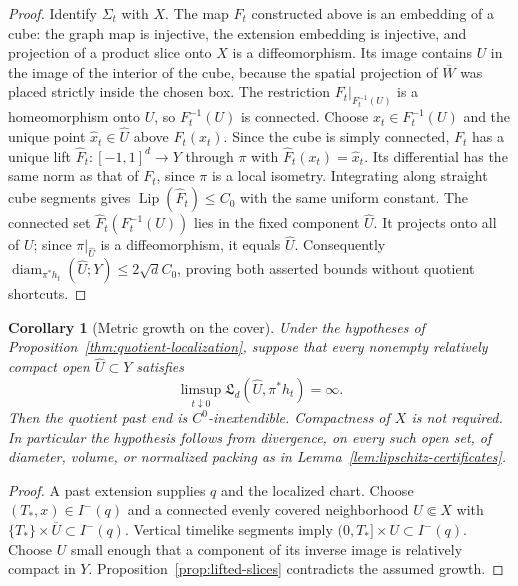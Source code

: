 \documentclass[10pt,a4paper]{article}
\numberwithin{equation}{section}
\newtheorem{corollary}[theorem]{Corollary}
\theoremstyle{definition}
\theoremstyle{remark}
\newcommand{\diam}{\operatorname{diam}}
\newcommand{\Lip}{\operatorname{Lip}}
\begin{document}
\begin{proof}
Identify $\Sigma_t$ with $X$.  The map $F_t$ constructed above is an
embedding of a cube: the graph map is injective, the extension embedding
is injective, and projection of a product slice onto $X$ is a
diffeomorphism.  Its image contains $U$ in the image of the interior of
the cube, because the spatial projection of $\overline W$ was placed
strictly inside the chosen box.  The restriction
$F_t|_{F_t^{-1}(U)}$ is a homeomorphism onto $U$, so $F_t^{-1}(U)$
is connected.
Choose $x_t\in F_t^{-1}(U)$ and the unique point
$\widehat x_t\in\widehat U$ above $F_t(x_t)$.  Since the cube is simply
connected, $F_t$ has a unique lift
$\widehat F_t:[-1,1]^d\to Y$ through $\pi$ with
$\widehat F_t(x_t)=\widehat x_t$.
Its differential has the same norm as that of $F_t$, since $\pi$ is a
local isometry.  Integrating along straight cube segments gives
$\Lip(\widehat F_t)\le C_0$ with the same uniform constant.
The connected set $\widehat F_t(F_t^{-1}(U))$ lies in the fixed component
$\widehat U$.  It projects onto all of $U$; since
$\pi|_{\widehat U}$ is a diffeomorphism, it equals $\widehat U$.
Consequently $\diam_{\pi^*h_t}(\widehat U;Y)\le2\sqrt d C_0$, proving
both asserted bounds without quotient shortcuts.
\end{proof}

\begin{corollary}[Metric growth on the cover]
\label{cor:cover-transfer}
Under the hypotheses of Proposition~\ref{thm:quotient-localization}, suppose
that every nonempty relatively compact open $\widehat U\subset Y$
satisfies
\[
 \limsup_{t\downarrow0}\mathfrak L_d(\widehat U,\pi^*h_t)=\infty.
\]
Then the quotient past end is $C^0$-inextendible.  Compactness of $X$ is
not required.  In particular the hypothesis follows from divergence,
on every such open set, of diameter, volume, or normalized packing
as in Lemma~\ref{lem:lipschitz-certificates}.
\end{corollary}

\begin{proof}
A past extension supplies $q$ and the localized chart.  Choose
$(T_*,x)\in I^-(q)$ and a connected evenly covered neighborhood
$U\Subset X$ with $\{T_*\}\times\overline U\subset I^-(q)$.
Vertical timelike segments imply
$(0,T_*]\times U\subset I^-(q)$.  Choose $U$ small enough that a
component of its inverse image is relatively compact in $Y$.
Proposition~\ref{prop:lifted-slices} contradicts the assumed growth.
\end{proof}
\end{document}
